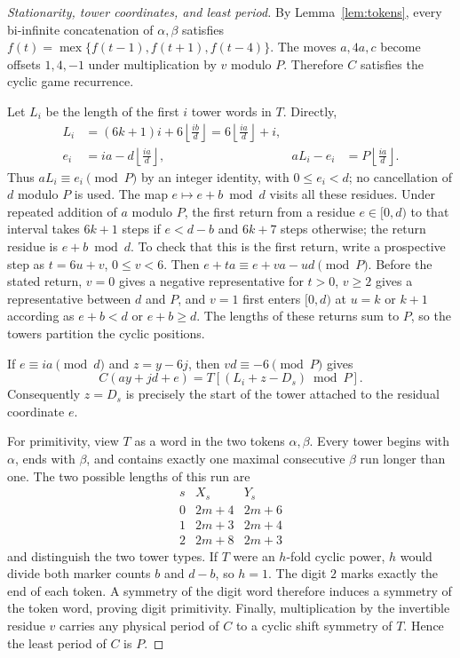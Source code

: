 \documentclass[11pt]{article}
\theoremstyle{remark}\newtheorem{remark}[theorem]{Remark}
\DeclareMathOperator{\mex}{mex}
\begin{document}
\begin{proof}[Stationarity, tower coordinates, and least period]
By Lemma~\ref{lem:tokens}, every bi-infinite concatenation of
$\alpha,\beta$ satisfies
$f(t)=\mex\{f(t-1),f(t+1),f(t-4)\}$.
The moves $a,4a,c$ become offsets $1,4,-1$ under multiplication by $v$
modulo $P$.  Therefore $C$ satisfies the cyclic game recurrence.

Let $L_i$ be the length of the first $i$ tower words in $T$.  Directly,
\begin{equation}\label{eq:upper-tower-coordinate}
 \begin{aligned}
 L_i&=(6k+1)i+6\left\lfloor\frac{ib}{d}\right\rfloor
     =6\left\lfloor\frac{ia}{d}\right\rfloor+i,\\
 e_i&=ia-d\left\lfloor\frac{ia}{d}\right\rfloor,
 &aL_i-e_i&=P\left\lfloor\frac{ia}{d}\right\rfloor.
 \end{aligned}
\end{equation}
Thus $aL_i\equiv e_i\pmod P$ by an integer identity, with
$0\le e_i<d$; no cancellation of $d$ modulo $P$ is used.
The map $e\mapsto e+b\bmod d$ visits all these residues.  Under repeated
addition of $a$ modulo $P$, the first return from a residue $e\in[0,d)$
to that interval takes $6k+1$ steps if $e<d-b$ and $6k+7$ steps otherwise;
the return residue is $e+b\bmod d$.  To check that this is the first
return, write a prospective step as $t=6u+v$, $0\le v<6$.
Then $e+ta\equiv e+va-ud\pmod P$.  Before the stated return,
$v=0$ gives a negative representative for $t>0$, $v\ge2$ gives a
representative between $d$ and $P$, and $v=1$ first enters $[0,d)$
at $u=k$ or $k+1$ according as $e+b<d$ or $e+b\ge d$.
The lengths of these returns sum to $P$, so the towers partition
the cyclic positions.

If $e\equiv ia\pmod d$ and $z=y-6j$, then $vd\equiv-6\pmod P$ gives
\begin{equation}\label{eq:upper-local-cycle}
 C(ay+jd+e)=T[(L_i+z-D_s)\bmod P].
\end{equation}
Consequently $z=D_s$ is precisely the start of the tower attached to
the residual coordinate $e$.

For primitivity, view $T$ as a word in the two tokens $\alpha,\beta$.
Every tower begins with $\alpha$, ends with $\beta$, and contains
exactly one maximal consecutive $\beta$ run longer than one.  The
two possible lengths of this run are
\[
\begin{array}{c|cc}
s&X_s&Y_s\\\hline
0&2m+4&2m+6\\
1&2m+3&2m+4\\
2&2m+8&2m+3
\end{array}
\]
and distinguish the two tower types.  If $T$ were an $h$-fold cyclic
power, $h$ would divide both marker counts $b$ and $d-b$, so $h=1$.
The digit $2$ marks exactly the end of each token.  A symmetry of the
digit word therefore induces a symmetry of the token word, proving
digit primitivity.  Finally, multiplication by the invertible residue
$v$ carries any physical period of $C$ to a cyclic shift symmetry of
$T$.  Hence the least period of $C$ is $P$.
\end{proof}
\end{document}
